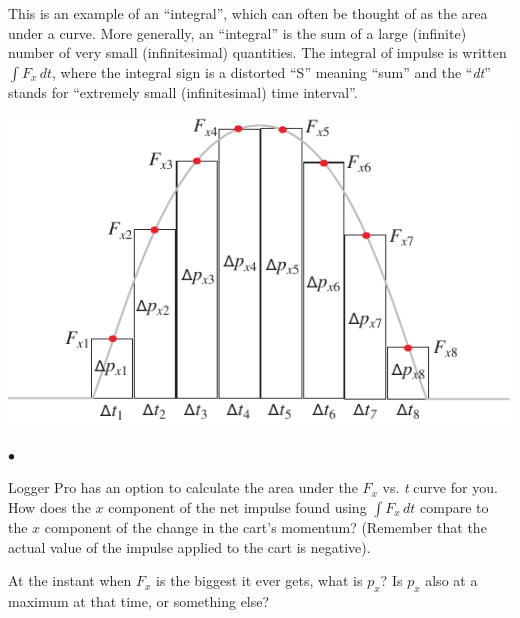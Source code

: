 \documentclass[11pt]{article}
\newcommand{\squishlist}{
   \begin{list}{$\bullet$}
    { \setlength{\itemsep}{0pt}      \setlength{\parsep}{3pt}
      \setlength{\topsep}{3pt}       \setlength{\partopsep}{0pt}
      \setlength{\leftmargin}{1.5em} \setlength{\labelwidth}{1em}
      \setlength{\labelsep}{0.5em} } }
\newcommand{\squishend}{
    \end{list}  }
\begin{document}
This is an example of an ``integral'', which can often be thought of as the area under a curve. More generally, an ``integral'' is the sum of a large (infinite) number of very small (infinitesimal) quantities. The integral of impulse is written $\int F_{x} \, dt $, where the integral sign is a distorted ``S'' meaning ``sum'' and the ``\textit{dt}'' stands for ``extremely small (infinitesimal) time interval''.

\begin{center}
\includegraphics[scale=1]{Ft-integral.pdf}
\end{center}

\squishlist
\item  Logger Pro has an option to calculate the area under the $F_x$ vs. \textit{t} curve for you.
 How does the $x$ component of the net impulse found using $\int F_{x} \, dt $ compare to the $x$ component of the change in the cart's momentum?
 (Remember that the actual value of the impulse applied to the cart is negative).

\item At the instant when $F_x$ is the biggest it ever gets, what is $p_x$? Is $p_x$  also at a maximum at that time, or something else?
\squishend
\end{document}
